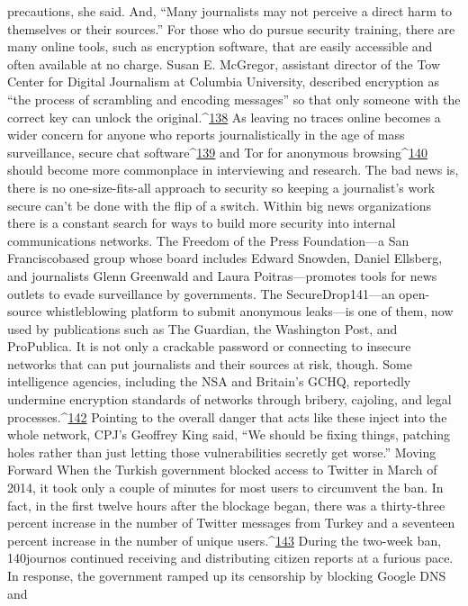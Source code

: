 precautions, she said. And, ``Many journalists may not perceive a direct harm to
themselves or their sources.''
For those who do pursue security training, there are many online tools, such as encryption
software, that are easily accessible and often available at no charge. Susan E. McGregor,
assistant director of the Tow Center for Digital Journalism at Columbia University,
described encryption as ``the process of scrambling and encoding messages'' so that only
someone with the correct key can unlock the original.^{\href{#endnotes}{138}} As leaving no traces online
becomes a wider concern for anyone who reports journalistically in the age of mass
surveillance, secure chat software^{\href{#endnotes}{139}} and Tor for anonymous browsing^{\href{#endnotes}{140}} should become
more commonplace in interviewing and research.
The bad news is, there is no one-size-fits-all approach to security so keeping a
journalist’s work secure can’t be done with the flip of a switch. Within big news
organizations there is a constant search for ways to build more security into internal
communications networks. The Freedom of the Press Foundation—a San Franciscobased
group whose board includes Edward Snowden, Daniel Ellsberg, and journalists
Glenn Greenwald and Laura Poitras—promotes tools for news outlets to evade
surveillance by governments. The SecureDrop141—an open-source whistleblowing
platform to submit anonymous leaks—is one of them, now used by publications such as
The Guardian, the Washington Post, and ProPublica.
It is not only a crackable password or connecting to insecure networks that can put
journalists and their sources at risk, though. Some intelligence agencies, including the
NSA and Britain’s GCHQ, reportedly undermine encryption standards of networks
through bribery, cajoling, and legal processes.^{\href{#endnotes}{142}} Pointing to the overall danger that acts
like these inject into the whole network, CPJ’s Geoffrey King said, ``We should be fixing
things, patching holes rather than just letting those vulnerabilities secretly get worse.''
Moving Forward
When the Turkish government blocked access to Twitter in March of 2014, it took only a
couple of minutes for most users to circumvent the ban. In fact, in the first twelve hours
after the blockage began, there was a thirty-three percent increase in the number of
Twitter messages from Turkey and a seventeen percent increase in the number of unique
users.^{\href{#endnotes}{143}} During the two-week ban, 140journos continued receiving and distributing
citizen reports at a furious pace.
In response, the government ramped up its censorship by blocking Google DNS and
